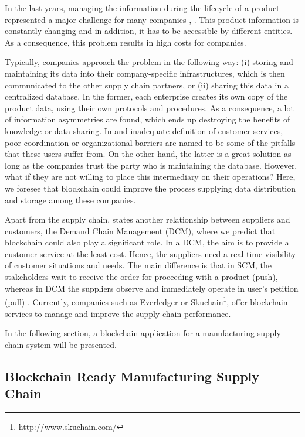 In the last years, managing the information during the lifecycle of a product represented a major challenge for many companies \citep{karkkainen2003product}, \citep{tuttle2002you}. This product information is constantly changing and in addition, it has to be accessible by different entities. As a consequence, this problem results in high costs for companies. 

Typically, companies approach the problem in the following way: (i) storing and maintaining its data into their company-specific infrastructures, which is then communicated to the other supply chain partners, or (ii) sharing this data in a centralized database. In the former, each enterprise creates its own copy of the product data, using their own protocols and procedures.  As a consequence, a lot of information asymmetries are found, which ends up destroying the benefits of knowledge or data sharing. In \citep{lee1992managing} and \citep{fiala2005information} inadequate definition of customer services, poor coordination or organizational barriers are named to be some of the pitfalls that these users suffer from. On the other hand, the latter is a great solution as long as the companies trust the party who is maintaining the database. However, what if they are not willing to place this intermediary on their operations? Here, we foresee that blockchain could improve the process supplying data distribution and storage among these companies.

Apart from the supply chain, \citep{heikkila2002supply} states another relationship between suppliers and customers, the Demand Chain Management (DCM), where we predict that blockchain could also play a significant role. In a DCM, the aim is to provide a customer service at the least cost. Hence, the suppliers need a real-time visibility of customer situations and needs. The main difference is that in SCM, the stakeholders wait to receive the order for proceeding with a product (push), whereas in DCM the suppliers observe and immediately operate in user's petition (pull) \citep{wust2017you}. Currently, companies such as Everledger or Skuchain\footnote{\url{http://www.skuchain.com/}}, offer blockchain services to manage and improve the supply chain performance.
 
In the following section, a blockchain application for a manufacturing supply chain system will be presented.

\subsection{Blockchain Ready Manufacturing Supply Chain} \label{manufacturing}


